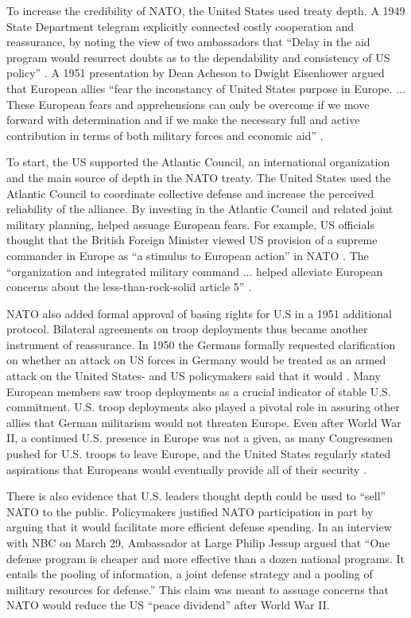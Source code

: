 \documentclass[12pt]{article}
\begin{document}
To increase the credibility of NATO, the United States used treaty depth.  
A 1949 State Department telegram explicitly connected costly cooperation and reassurance, by noting the view of two ambassadors that ``Delay in the aid program would resurrect doubts as to the dependability and consistency of US policy'' \citep{state-summary-0607-49}. 
A 1951 presentation by Dean Acheson to Dwight Eisenhower argued that European allies ``fear the inconstancy of United States purpose in Europe. ... These European fears and apprehensions can only be overcome if we move forward with determination and if we make the necessary full and active contribution in terms of both military forces and economic aid'' \citep[pg. 3]{Acheson1951}. 


To start, the US supported the Atlantic Council, an international organization and the main source of depth in the NATO treaty. 
The United States used the Atlantic Council to coordinate collective defense and increase the perceived reliability of the alliance. 
By investing in the Atlantic Council and related joint military planning, helped assuage European fears. 
For example, US officials thought that the British Foreign Minister viewed US provision of a supreme commander in Europe as ``a stimulus to European action'' in NATO \citep{Acheson1950}. 
The ``organization and integrated military command ... helped alleviate European concerns about the less-than-rock-solid article 5'' \citep[pg. 26]{Sayle2019}.


NATO also added formal approval of basing rights for U.S in a 1951 additional protocol.  
Bilateral agreements on troop deployments thus became another instrument of reassurance. 
In 1950 the Germans formally requested clarification on whether an attack on US forces in Germany would be treated as an armed attack on the United States- and US policymakers said that it would \citep[pg. 395]{Acheson1969}.  
Many European members saw troop deployments as a crucial indicator of stable U.S. commitment. 
U.S. troop deployments also played a pivotal role in assuring other allies that German militarism would not threaten Europe. 
Even after World War II, a continued U.S. presence in Europe was not a given, as many Congressmen pushed for U.S. troops to leave Europe, and the United States regularly stated aspirations that Europeans would eventually provide all of their security \citep[pg. 20]{Sayle2019}. 


There is also evidence that U.S. leaders thought depth could be used to ``sell'' NATO to the public. 
Policymakers justified NATO participation in part by arguing that it would facilitate more efficient defense spending. 
In an interview with NBC on March 29, Ambassador at Large Philip Jessup argued that ``One defense program is cheaper and more effective than a dozen national programs. It entails the pooling of information, a joint defense strategy and a pooling of military resources for defense.''
This claim was meant to assuage concerns that NATO would reduce the US ``peace dividend'' after World War II. 
\end{document}
